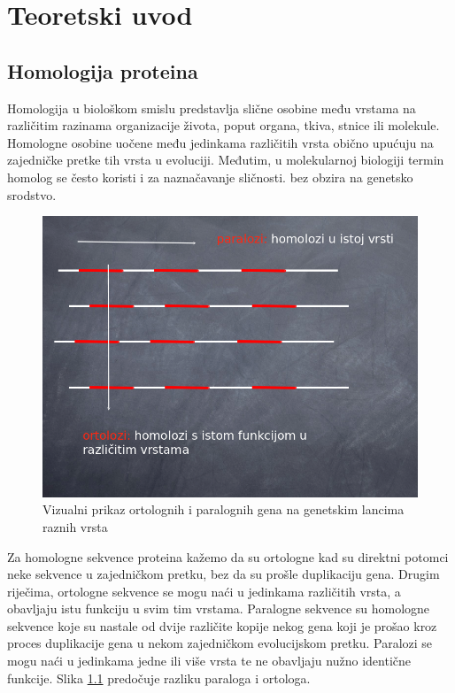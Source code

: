 \chapter{Teoretski uvod}
\label{chap:teoretski-uvod}

\section{Homologija proteina}
\label{sec:homologija}

Homologija u biološkom smislu predstavlja slične osobine među vrstama na
različitim razinama organizacije života, poput organa, tkiva, stnice ili
molekule. Homologne osobine uočene među jedinkama različitih vrsta obično
upućuju na zajedničke pretke tih vrsta u evoluciji. Međutim, u molekularnoj
biologiji termin homolog se često koristi i za naznačavanje sličnosti. bez
obzira na genetsko srodstvo.\cite{bioinfo1}

\begin{figure}[h!]
\centering
\includegraphics[width=4.5in]{figures/ortho-para.png}
\caption{Vizualni prikaz ortolognih i paralognih gena na genetskim lancima
raznih vrsta}
\label{fig:para-ortho}
\end{figure}

Za homologne sekvence proteina kažemo da su ortologne kad su direktni
potomci neke sekvence u zajedničkom pretku, bez da su prošle duplikaciju
gena. Drugim riječima, ortologne sekvence se mogu naći u jedinkama
različitih vrsta, a obavljaju istu funkciju u svim tim vrstama. Paralogne
sekvence su homologne sekvence koje su nastale od dvije različite kopije
nekog gena koji je prošao kroz proces duplikacije gena u nekom zajedničkom
evolucijskom pretku. Paralozi se mogu naći u jedinkama jedne ili više vrsta te
ne obavljaju nužno identične funkcije. Slika \ref{fig:para-ortho} predočuje
razliku paraloga i ortologa.




